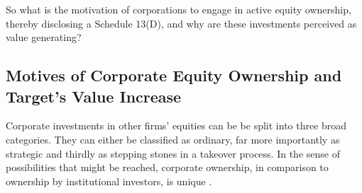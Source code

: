 \documentclass[12pt]{article}
\begin{document}
So what is the motivation of corporations to engage in active equity ownership, thereby disclosing a Schedule 13(D), and why are these investments perceived as value generating?

\subsection{Motives of Corporate Equity Ownership and Target's Value Increase}

Corporate investments in other firms' equities can be be split into three broad categories. They can either be classified as ordinary, far more importantly as strategic and thirdly as stepping stones in a takeover process. 
In the sense of possibilities that might be reached, corporate ownership, in comparison to ownership by institutional investors, is unique \citep[p.2791]{Allen2000}.
\end{document}
